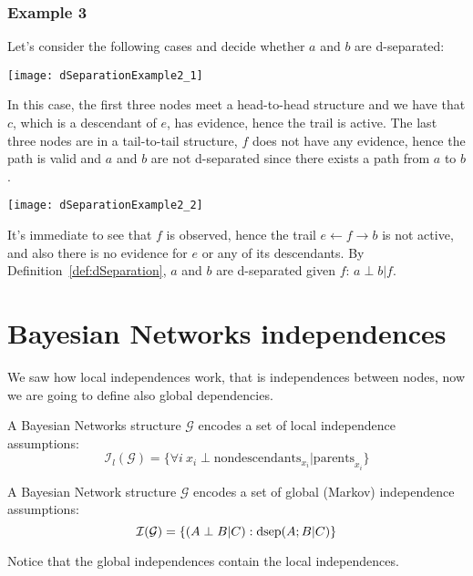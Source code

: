 \subsubsection{Example 3}
Let's consider the following cases and decide whether $a$ and $b$ are d-separated:
\begin{center}
  \begin{minipage}[t]{\linewidth}
    \begin{minipage}[t]{0.48\linewidth}
      \begin{center}
        \texttt{[image: dSeparationExample2\_1]}
      \end{center}
      In this case, the first three nodes meet a head-to-head structure and we have that $c$, which is a descendant of $e$, has evidence, hence the trail is active. The last three nodes are in a tail-to-tail structure, $f$ does not have any evidence, hence the path is valid and $a$ and $b$ are not d-separated since there exists a path from $a$ to $b$. 
    \end{minipage}
    \hspace{0.03\linewidth}
    \begin{minipage}[t]{0.48\linewidth}
      \begin{center}
        \texttt{[image: dSeparationExample2\_2]}
      \end{center}
      It's immediate to see that $f$ is observed, hence the trail $e\leftarrow f\rightarrow b$ is not active, and also there is no evidence for $e$ or any of its descendants. By Definition~\ref{def:dSeparation}, $a$ and $b$ are d-separated given $f$: $a\perp b\vert f$.
    \end{minipage}
  \end{minipage}
\end{center}
%
%
%
\section{Bayesian Networks independences}
We saw how local independences work, that is independences between nodes, now we are going to define also global dependencies. \newline
\begin{definition}
  A Bayesian Networks structure $\mathcal{G}$ encodes a set of local independence assumptions:
  \[\mathcal{I}_l(\mathcal{G})=\{\forall i~ x_i\perp \text{nondescendants}_{x_i}\vert \text{parents}_{x_i}\}\]
\end{definition}
\begin{definition}
  A Bayesian Network structure $\mathcal{G}$ encodes a set of global (Markov) independence assumptions:
  \[\mathcal{I}(\mathcal{G})=\{(A\perp B\vert C):\text{dsep}(A;B\vert C)\}\]
\end{definition}
Notice that the global independences contain the local independences.
%
%
%
